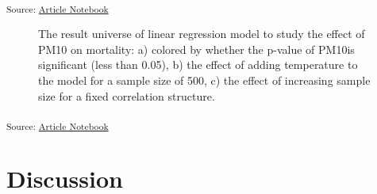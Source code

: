 \documentclass[
]{jds}
\begin{document}
\textsubscript{Source:
\href{https://huizezhang-sherry.github.io/paper-analysis-plan/index.qmd.html}{Article
Notebook}}

\label{cell-fig-result-universe}
\begin{figure}[H]


\caption{\label{fig-result-universe}The result universe of linear
regression model to study the effect of PM10 on mortality: a) colored by
whether the p-value of PM10is significant (less than 0.05), b) the
effect of adding temperature to the model for a sample size of 500, c)
the effect of increasing sample size for a fixed correlation structure.}

\end{figure}%

\textsubscript{Source:
\href{https://huizezhang-sherry.github.io/paper-analysis-plan/index.qmd.html}{Article
Notebook}}

\section{Discussion}\label{discussion}
\end{document}
